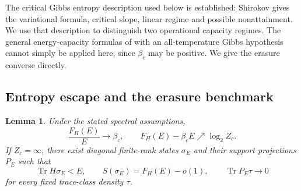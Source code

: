 \documentclass[11pt]{article}
\newtheorem{lemma}[theorem]{Lemma}
\newcommand{\Tr}{\operatorname{Tr}}
\begin{document}
The critical Gibbs entropy description used below is established:
Shirokov \cite[Proposition 1a]{shirokoventropy} gives the variational
formula, critical slope, linear regime and possible nonattainment.
We use that description to distinguish two operational capacity regimes.
The general energy-capacity formulas of \cite{wq,dsw} with an
all-temperature Gibbs hypothesis cannot simply be applied here, since
$\beta_c$ may be positive. We give the erasure converse directly.

\subsection{Entropy escape and the erasure benchmark}
\begin{lemma}\label{lem:spectral-escape}
Under the stated spectral assumptions,
\begin{equation}\label{eq:critical-entropy}
 \frac{F_H(E)}{E}\longrightarrow\beta_c,\qquad
 F_H(E)-\beta_cE\nearrow\log_2 Z_c.
\end{equation}
If $Z_c=\infty$, there exist diagonal finite-rank states $\sigma_E$
and their support projections $P_E$ such that
\begin{equation}\label{eq:spectral-escape}
 \Tr H\sigma_E<E,\qquad
 S(\sigma_E)=F_H(E)-o(1),\qquad
 \Tr P_E\tau\longrightarrow0
\end{equation}
for every fixed trace-class density $\tau$.
\end{lemma}
\end{document}
